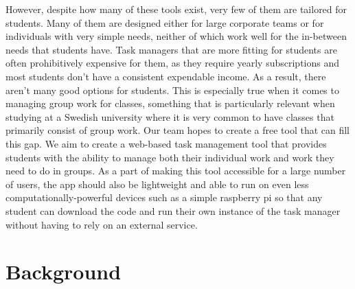 \documentclass[11pt]{report}
\begin{document}
However, despite how many of these tools exist, very few of them are tailored for students. Many of them are designed either for large corporate teams or for individuals with very simple needs, neither of which work well for the in-between needs that students have. Task managers that are more fitting for students are often prohibitively expensive for them, as they require yearly subscriptions and most students don’t have a consistent expendable income. As a result, there aren’t many good options for students. This is especially true when it comes to managing group work for classes, something that is particularly relevant when studying at a Swedish university where it is very common to have classes that primarily consist of group work.
Our team hopes to create a free tool that can fill this gap. We aim to create a web-based task management tool that provides students with the ability to manage both their individual work and work they need to do in groups. As a part of making this tool accessible for a large number of users, the app should also be lightweight and able to run on even less computationally-powerful devices such as a simple raspberry pi \citep{upton2016raspberry} so that any student can download the code and run their own instance of the task manager without having to rely on an external service.

\chapter{Background}
\label{cha:background}
\end{document}
